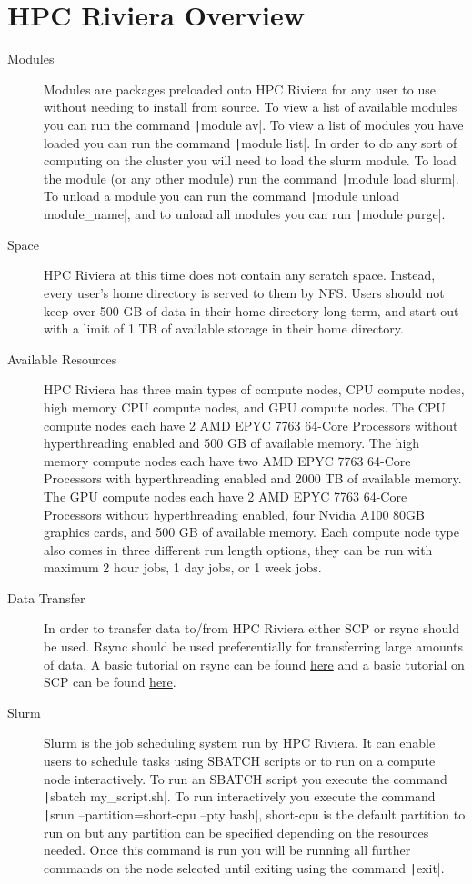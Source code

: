 \documentclass[11pt,letterpaper]{article}
\begin{document}
\section{HPC Riviera Overview}
\begin{description}
    \item[Modules] Modules are packages preloaded onto HPC Riviera for any user to use without needing to install from source. To view a list of available modules you can run the command \texttt|module av|. To view a list of modules you have loaded you can run the command \texttt|module list|. In order to do any sort of computing on the cluster you will need to load the slurm module. To load the module (or any other module) run the command \texttt|module load slurm|. To unload a module you can run the command \texttt|module unload module_name|, and to unload all modules you can run \texttt|module purge|.
    \item[Space] HPC Riviera at this time does not contain any scratch space. Instead, every user's home directory is served to them by NFS. Users should not keep over 500 GB of data in their home directory long term, and start out with a limit of 1 TB of available storage in their home directory.
    \pagebreak
    \item[Available Resources] HPC Riviera has three main types of compute nodes, CPU compute nodes, high memory CPU compute nodes, and GPU compute nodes. The CPU compute nodes each have 2 AMD EPYC 7763 64-Core Processors without hyperthreading enabled and 500 GB of available memory. The high memory compute nodes each have two AMD EPYC 7763 64-Core Processors with hyperthreading enabled and 2000 TB of available memory. The GPU compute nodes each have 2 AMD EPYC 7763 64-Core Processors without hyperthreading enabled, four Nvidia A100 80GB graphics cards, and 500 GB of available memory. Each compute node type also comes in three different run length options, they can be run with maximum 2 hour jobs, 1 day jobs, or 1 week jobs.
    \item[Data Transfer] In order to transfer data to/from HPC Riviera either SCP or rsync should be used. Rsync should be used preferentially for transferring large amounts of data. A basic tutorial on rsync can be found \href{https://linuxize.com/post/how-to-use-rsync-for-local-and-remote-data-transfer-and-synchronization/}{here} and a basic tutorial on SCP can be found \href{https://linuxize.com/post/how-to-use-scp-command-to-securely-transfer-files/}{here}.
    \item[Slurm] Slurm is the job scheduling system run by HPC Riviera. It can enable users to schedule tasks using SBATCH scripts or to run on a compute node interactively. To run an SBATCH script you execute the command \texttt|sbatch my_script.sh|. To run interactively you execute the command \texttt|srun --partition=short-cpu --pty bash|, short-cpu is the default partition to run on but any partition can be specified depending on the resources needed. Once this command is run you will be running all further commands on the node selected until exiting using the command \texttt|exit|. 
\end{description}
\end{document}
